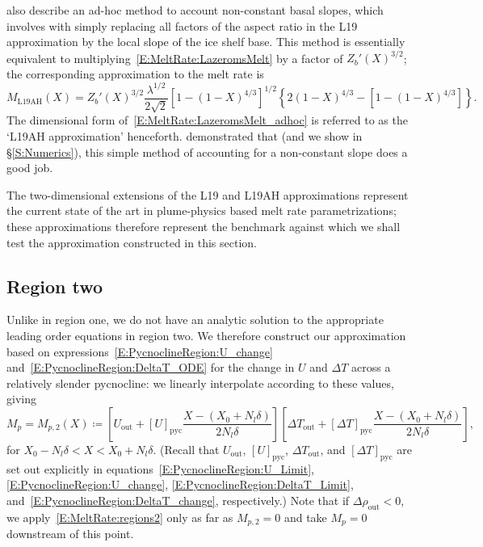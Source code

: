 \documentclass{jfm}
\newcommand{\lt}{\delta} %
\newcommand{\out}{\text{out}}
\begin{document}
\cite{Lazeroms2019JPhysOcean} also describe an ad-hoc method to account non-constant basal slopes, which involves with simply replacing all factors of the aspect ratio in the L19 approximation by the local slope of the ice shelf base. This method is essentially equivalent to multiplying~\eqref{E:MeltRate:LazeromsMelt} by a factor of $Z_b'(X)^{3/2}$; the corresponding approximation to the melt rate is
\begin{equation}\label{E:MeltRate:LazeromsMelt_adhoc}
M_{\text{L19AH}}(X) =Z_b'(X)^{3/2} \frac{\lambda^{1/2}}{2\sqrt{2}}\left[1 - (1 - X)^{4/3}\right]^{1/2}\left\{2(1-X)^{4/3} - \left[1- (1 - X)^{4/3}\right]\right\}.
\end{equation}
The dimensional form of~\eqref{E:MeltRate:LazeromsMelt_adhoc} is referred to as the `L19AH approximation' henceforth. \cite{Lazeroms2019JPhysOcean} demonstrated that (and we show in \S\ref{S:Numerics}), this simple method of accounting for a non-constant slope does a good job. 

The two-dimensional extensions of the L19 and L19AH approximations represent the current state of the art in plume-physics based melt rate parametrizations; these approximations therefore represent the benchmark against which we shall test the approximation constructed in this section.

\subsection{Region two}
Unlike in region one, we do not have an analytic solution to the appropriate leading order equations in region two. We therefore construct our approximation based on expressions~\eqref{E:PycnoclineRegion:U_change} and~\eqref{E:PycnoclineRegion:DeltaT_ODE} for the change in $U$ and $\Delta T$ across a relatively slender pycnocline: we linearly interpolate according to these values, giving
\begin{equation}\label{E:MeltRate:regions2}
M_{p} = M_{p,2}(X) \coloneqq \left[U_{\out} + \left[U\right]_{\text{pyc}} \frac{X - (X_0 + N_l \lt)}{2N_l \lt}\right]  \left[\Delta T_{\out} +  \left[\Delta T\right]_{\text{pyc}} \frac{X - (X_0 + N_l \lt)}{2N_l \lt}\right] , 
\end{equation}
for $ X_0 - N_l \lt  < X < X_0 + N_l \lt$. (Recall that $U_\out$, $\left[U\right]_{\text{pyc}}$, $\Delta T_\out$, and $\left[\Delta T\right]_{\text{pyc}}$ are set out explicitly in equations~\eqref{E:PycnoclineRegion:U_Limit}, \eqref{E:PycnoclineRegion:U_change}, \eqref{E:PycnoclineRegion:DeltaT_Limit}, and~\eqref{E:PycnoclineRegion:DeltaT_change}, respectively.) Note that if $\Delta \rho_\out < 0$, we apply~\eqref{E:MeltRate:regions2} only as far as $M_{p,2} = 0$ and take $M_{p} = 0$ downstream of this point.
\end{document}

